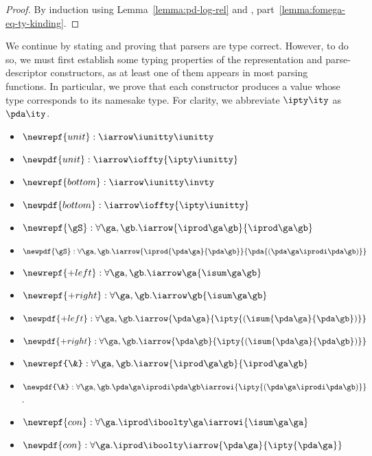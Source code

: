 \begin{proof}
  By induction using Lemma~\ref{lemma:pd-log-rel} and
  , part~\ref{lemma:fomega-eq-ty-kinding}.
\end{proof}

We continue by stating and proving that parsers are type correct.
However, to do so, we must first establish some typing properties of
the representation and parse-descriptor constructors, as at least one of them appears in most
parsing functions. In particular, we prove that each constructor
produces a value whose type corresponds to its namesake \ddc{}
type. For clarity, we abbreviate $\ipty \ity$ as $\pda \ity$.

\begin{lemma}
\label{lem:types-of-constructors}
\begin{itemize}
\item $\newrepf {unit} : \iarrow \iunitty \iunitty$
\item $\newpdf  {unit} : \iarrow \ioffty {\ipty \iunitty}$
\item $\newrepf {bottom} : \iarrow \iunitty \invty$
\item $\newpdf  {bottom} : \iarrow \ioffty {\ipty \iunitty}$
\item $\newrepf {\gS} : \forall \ga,\gb.\iarrow {\iprod \ga \gb} {\iprod \ga \gb}$
\item $\newpdf {\gS} : \forall \ga,\gb. 
  \iarrow {\iprod {\pda \ga} {\pda \gb}}
  {\pda {(\pda \ga \iprodi \pda \gb)}}
$
\item $\newrepf {+left} : \forall \ga, \gb.\iarrow \ga 
                            {\isum \ga \gb}$
\item $\newrepf {+right} : \forall \ga, \gb.\iarrow \gb {\isum \ga \gb}$
\item $\newpdf {+left} : \forall \ga, \gb.\iarrow {\pda \ga} 
  {\ipty {(\isum {\pda \ga}{\pda \gb})}}$
\item $\newpdf {+right} :\forall  \ga, \gb. \iarrow {\pda \gb} 
                            {\ipty {(\isum {\pda \ga} {\pda \gb})}}$
\item $\newrepf {\&} : \forall \ga,\gb.\iarrow {\iprod \ga \gb} {\iprod \ga \gb}$
\item $\newpdf {\&} : 
\forall \ga,\gb.
  \pda \ga \iprodi
  \pda \gb \iarrowi 
         {\ipty {(\pda \ga \iprodi \pda \gb)}}
$.
\item $\newrepf {con} : \forall \ga.\iprod \iboolty \ga 
  \iarrowi {\isum \ga \ga}$
\item $\newpdf {con} :\forall  \ga. \iprod \iboolty \iarrow {\pda \ga} {\ipty {\pda \ga}}$

\end{itemize}
\end{lemma}
